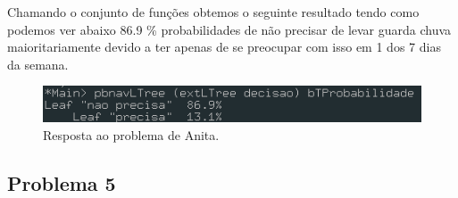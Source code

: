 \documentclass[a4paper]{article}
\begin{document}
Chamando o conjunto de funções obtemos o seguinte resultado tendo como podemos ver abaixo 86.9 \% probabilidades de não precisar de levar guarda chuva maioritariamente devido a ter apenas de se preocupar com isso em 1 dos 7 dias da semana.

\begin{figure}[!h]\centering
    \includegraphics[scale=0.80]{images/P3-Anita.png}
    \caption{Resposta ao problema de Anita.}
    \label{fig:anita}
    \end{figure}

\subsection*{Problema 5}
\end{document}
